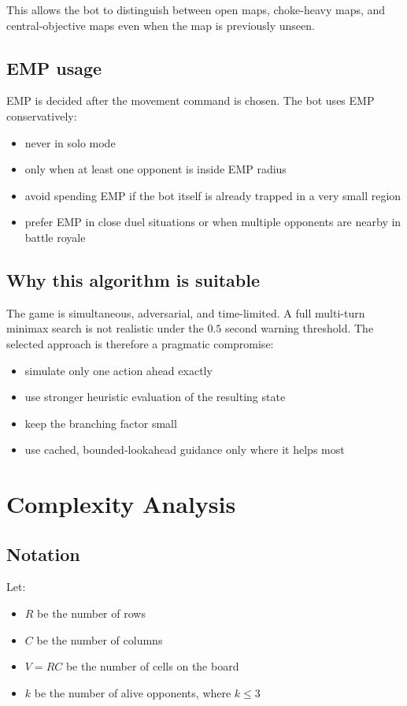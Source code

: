 \documentclass[11pt,a4paper]{article}
\begin{document}
This allows the bot to distinguish between open maps, choke-heavy maps, and central-objective maps even when the map is previously unseen.

\subsection{EMP usage}
EMP is decided after the movement command is chosen. The bot uses EMP conservatively:
\begin{itemize}[leftmargin=*]
    \item never in solo mode
    \item only when at least one opponent is inside EMP radius
    \item avoid spending EMP if the bot itself is already trapped in a very small region
    \item prefer EMP in close duel situations or when multiple opponents are nearby in battle royale
\end{itemize}

\subsection{Why this algorithm is suitable}
The game is simultaneous, adversarial, and time-limited. A full multi-turn minimax search is not realistic under the \(0.5\) second warning threshold. The selected approach is therefore a pragmatic compromise:
\begin{itemize}[leftmargin=*]
    \item simulate only one action ahead exactly
    \item use stronger heuristic evaluation of the resulting state
    \item keep the branching factor small
    \item use cached, bounded-lookahead guidance only where it helps most
\end{itemize}

\section{Complexity Analysis}
\subsection{Notation}
Let:
\begin{itemize}[leftmargin=*]
    \item \(R\) be the number of rows
    \item \(C\) be the number of columns
    \item \(V = RC\) be the number of cells on the board
    \item \(k\) be the number of alive opponents, where \(k \le 3\)
\end{itemize}
\end{document}
